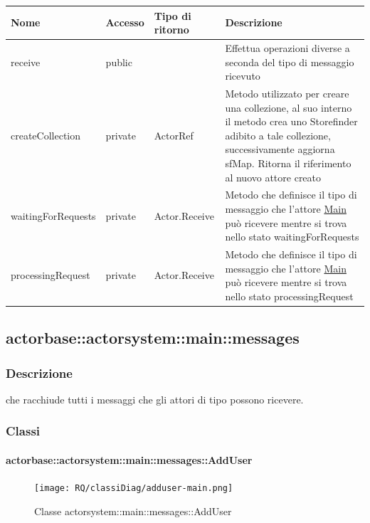\documentclass{scalatekids-article}
\begin{document}
\begin{tabular}{| p{3.5cm} | p{1.5cm} | p{2.5cm} | p{9.5cm} |}
  \hline
  Nome & Accesso & Tipo di ritorno & Descrizione\\
  \hline
  receive & public &  & Effettua operazioni diverse a seconda del tipo di messaggio ricevuto\\
  \hline
  createCollection & private & ActorRef & Metodo utilizzato per creare una collezione, al suo interno il metodo crea uno Storefinder adibito a tale collezione, successivamente aggiorna sfMap. Ritorna il riferimento al nuovo attore creato\\
  \hline
  waitingForRequests & private & Actor.Receive & Metodo che definisce il tipo di messaggio che l'attore \hyperref[sec:actorbase::actorsystem::main::Main]{Main} può ricevere mentre si trova nello stato waitingForRequests\\
  \hline
  processingRequest & private & Actor.Receive & Metodo che definisce il tipo di messaggio che l'attore \hyperref[sec:actorbase::actorsystem::main::Main]{Main} può ricevere mentre si trova nello stato processingRequest\\
  \hline
\end{tabular}

\subsection{actorbase::actorsystem::main::messages}
\label{sec:actorbase::actorsystem::main::messages}

\subsubsection{Descrizione}
 che racchiude tutti i messaggi che gli attori di tipo
 possono ricevere.

\subsubsection{Classi}

\paragraph{actorbase::actorsystem::main::messages::AddUser}
\label{sec:actorbase::actorsystem::main::messages::AddUser}

\begin{figure}[H]
   \begin{center}
     \texttt{[image: RQ/classiDiag/adduser-main.png]}
     \caption{Classe actorsystem::main::messages::AddUser}
   \end{center}
 \end{figure}
\end{document}

